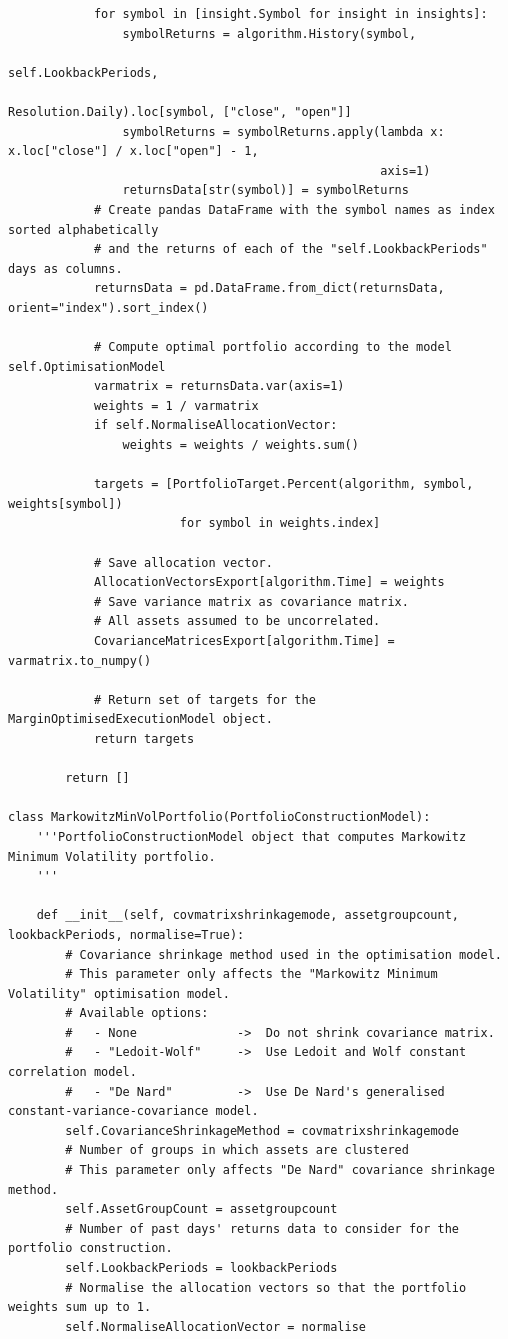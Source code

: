 \begin{verbatim}
            for symbol in [insight.Symbol for insight in insights]:
                symbolReturns = algorithm.History(symbol,
                                                  self.LookbackPeriods,
                                                  Resolution.Daily).loc[symbol, ["close", "open"]]
                symbolReturns = symbolReturns.apply(lambda x: x.loc["close"] / x.loc["open"] - 1,
                                                    axis=1)
                returnsData[str(symbol)] = symbolReturns
            # Create pandas DataFrame with the symbol names as index sorted alphabetically
            # and the returns of each of the "self.LookbackPeriods" days as columns.
            returnsData = pd.DataFrame.from_dict(returnsData, orient="index").sort_index()
            
            # Compute optimal portfolio according to the model self.OptimisationModel
            varmatrix = returnsData.var(axis=1)
            weights = 1 / varmatrix
            if self.NormaliseAllocationVector:
                weights = weights / weights.sum()
                
            targets = [PortfolioTarget.Percent(algorithm, symbol, weights[symbol])
                        for symbol in weights.index]
            
            # Save allocation vector.
            AllocationVectorsExport[algorithm.Time] = weights
            # Save variance matrix as covariance matrix.
            # All assets assumed to be uncorrelated.
            CovarianceMatricesExport[algorithm.Time] = varmatrix.to_numpy()
            
            # Return set of targets for the MarginOptimisedExecutionModel object.
            return targets
            
        return []
        
class MarkowitzMinVolPortfolio(PortfolioConstructionModel):
    '''PortfolioConstructionModel object that computes Markowitz Minimum Volatility portfolio.
    '''
    
    def __init__(self, covmatrixshrinkagemode, assetgroupcount, lookbackPeriods, normalise=True):
        # Covariance shrinkage method used in the optimisation model.
        # This parameter only affects the "Markowitz Minimum Volatility" optimisation model.
        # Available options:
        #   - None              ->  Do not shrink covariance matrix.
        #   - "Ledoit-Wolf"     ->  Use Ledoit and Wolf constant correlation model.
        #   - "De Nard"         ->  Use De Nard's generalised constant-variance-covariance model.
        self.CovarianceShrinkageMethod = covmatrixshrinkagemode
        # Number of groups in which assets are clustered
        # This parameter only affects "De Nard" covariance shrinkage method.
        self.AssetGroupCount = assetgroupcount
        # Number of past days' returns data to consider for the portfolio construction.
        self.LookbackPeriods = lookbackPeriods
        # Normalise the allocation vectors so that the portfolio weights sum up to 1.
        self.NormaliseAllocationVector = normalise
        

\end{verbatim}
